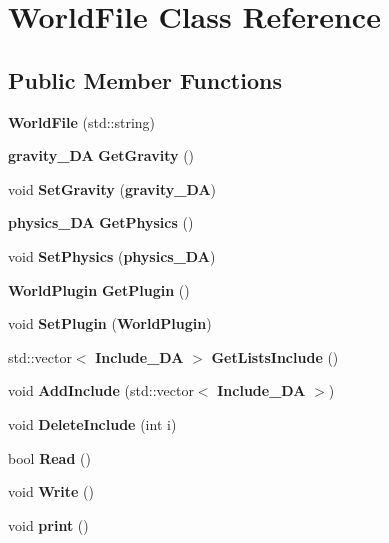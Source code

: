\section{World\+File Class Reference}
\label{class_world_file}
\subsection*{Public Member Functions}
\begin{DoxyCompactItemize}
\item 
{\bfseries World\+File} (std\+::string)\label{class_world_file_a3838bf9cb91ee559df6d63fc085254b3}

\item 
{\bf gravity\+\_\+\+DA} {\bfseries Get\+Gravity} ()\label{class_world_file_a6672742f64e0b5dc50118f8d19c56a28}

\item 
void {\bfseries Set\+Gravity} ({\bf gravity\+\_\+\+DA})\label{class_world_file_a8acebe0bd25f76d1e950008faaaff5e5}

\item 
{\bf physics\+\_\+\+DA} {\bfseries Get\+Physics} ()\label{class_world_file_a1397c06604215e1ec110cecfb9661d39}

\item 
void {\bfseries Set\+Physics} ({\bf physics\+\_\+\+DA})\label{class_world_file_a4ed15a93015cacee226085f9d1d5e592}

\item 
{\bf World\+Plugin} {\bfseries Get\+Plugin} ()\label{class_world_file_ad31877eb92fea3efbb8c54382951cbc0}

\item 
void {\bfseries Set\+Plugin} ({\bf World\+Plugin})\label{class_world_file_aaa956c408f22cc8bcec99b0684e72e8c}

\item 
std\+::vector$<$ {\bf Include\+\_\+\+DA} $>$ {\bfseries Get\+Lists\+Include} ()\label{class_world_file_a2da7af25c5825305c7d9888e2959903d}

\item 
void {\bfseries Add\+Include} (std\+::vector$<$ {\bf Include\+\_\+\+DA} $>$)\label{class_world_file_afec28bb67e4cc03fc63fe40771dbca91}

\item 
void {\bfseries Delete\+Include} (int i)\label{class_world_file_ac172c2f52d8279dd4539add0b8ddd0f3}

\item 
bool {\bfseries Read} ()\label{class_world_file_a3b15ac019b483e870748e4d2a01377d5}

\item 
void {\bfseries Write} ()\label{class_world_file_ab46c69e9f2078b8aa87ed94a8cece4dc}

\item 
void {\bfseries print} ()\label{class_world_file_a0012ac651fc84079bea8d8f0a4a5f8db}

\end{DoxyCompactItemize}
